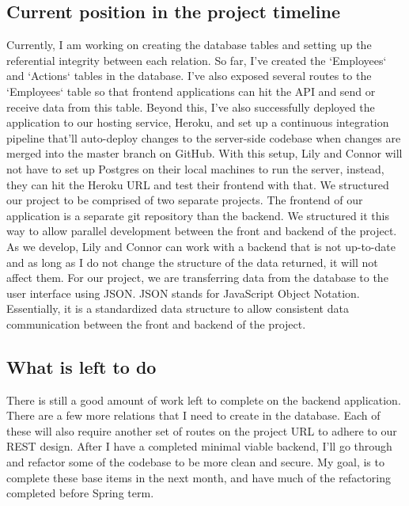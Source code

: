 \documentclass[draftclsnofoot,onecolumn,letterpaper,10pt,compsoc]{IEEEtran}
\begin{document}
\subsection{Current position in the project timeline}
Currently, I am working on creating the database tables and setting up the referential integrity between each relation.
So far, I’ve created the `Employees` and `Actions` tables in the database.
I’ve also exposed several routes to the `Employees` table so that frontend applications can hit the API and send or receive data from this table.
Beyond this, I’ve also successfully deployed the application to our hosting service, Heroku, and set up a continuous integration pipeline that’ll auto-deploy changes to the server-side codebase when changes are merged into the master branch on GitHub.
With this setup, Lily and Connor will not have to set up Postgres on their local machines to run the server, instead, they can hit the Heroku URL and test their frontend with that.
We structured our project to be comprised of two separate projects.
The frontend of our application is a separate git repository than the backend.
We structured it this way to allow parallel development between the front and backend of the project.
As we develop, Lily and Connor can work with a backend that is not up-to-date and as long as I do not change the structure of the data returned, it will not affect them.
For our project, we are transferring data from the database to the user interface using JSON.
JSON stands for JavaScript Object Notation.
Essentially, it is a standardized data structure to allow consistent data communication between the front and backend of the project.

\subsection{What is left to do}
There is still a good amount of work left to complete on the backend application.
There are a few more relations that I need to create in the database.
Each of these will also require another set of routes on the project URL to adhere to our REST design.
After I have a completed minimal viable backend, I’ll go through and refactor some of the codebase to be more clean and secure.
My goal, is to complete these base items in the next month, and have much of the refactoring completed before Spring term.
\end{document}
